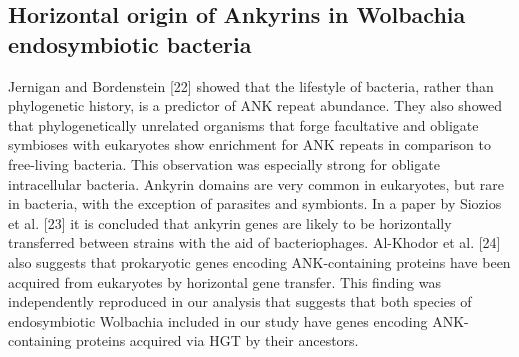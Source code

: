 \subsection{Horizontal origin of Ankyrins in Wolbachia endosymbiotic bacteria}
Jernigan and Bordenstein [22] showed that the lifestyle of bacteria, rather
than phylogenetic history, is a predictor of ANK repeat abundance. They also
showed that phylogenetically unrelated organisms that forge facultative and
obligate symbioses with eukaryotes show enrichment for ANK repeats in
comparison to free-living bacteria. This observation was especially strong for
obligate intracellular bacteria. Ankyrin domains are very common in eukaryotes,
but rare in bacteria, with the exception of parasites and symbionts. In a paper
by Siozios et al. [23] it is concluded that ankyrin genes are likely to be
horizontally transferred between strains with the aid of bacteriophages.
Al-Khodor et al. [24] also suggests that prokaryotic genes encoding
ANK-containing proteins have been acquired from eukaryotes by horizontal gene
transfer. This finding was independently reproduced in our analysis that
suggests that both species of endosymbiotic Wolbachia included in our study
have genes encoding ANK-containing proteins acquired via HGT by their
ancestors.
